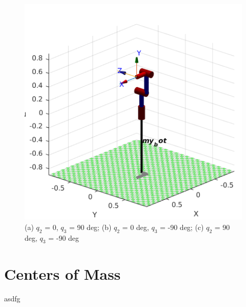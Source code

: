 \documentclass{article}
\begin{document}
\begin{center}
\begin{figure}[!htb]
\begin{minipage}{0.33\textwidth}
   \end{minipage}\hfill
   \begin{minipage}{0.33\textwidth}
     \centering
     \includegraphics[width=\linewidth]{images/frame3_q2_90_q3_-90.png}
   \end{minipage}
   \caption{(a) $q_2$ = 0, $q_3$ = 90 deg; (b) $q_2$ = 0 deg, $q_3$ = -90 deg; (c) $q_2$ = 90 deg, $q_3$ = -90 deg}

\end{figure} 
\end{center}
\section{Centers of Mass}
asdfg
\end{document}
